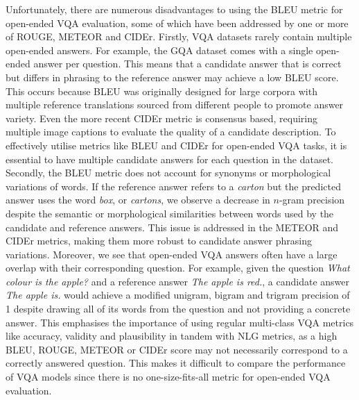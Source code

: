 Unfortunately, there are numerous disadvantages to using the BLEU metric for open-ended VQA evaluation, some of which have been addressed by one or more of ROUGE, METEOR and CIDEr.
Firstly, VQA datasets rarely contain multiple open-ended answers. For example, the GQA dataset \cite{hudson2019gqa} comes with a single open-ended answer per question. This means that a candidate answer that is correct but differs in phrasing to the reference answer may achieve a low BLEU score. This occurs because BLEU was originally designed for large corpora with multiple reference translations sourced from different people to promote answer variety. Even the more recent CIDEr metric is consensus based, requiring multiple image captions to evaluate the quality of a candidate description. To effectively utilise metrics like BLEU and CIDEr for open-ended VQA tasks, it is essential to have multiple candidate answers for each question in the dataset.
Secondly, the BLEU metric does not account for synonyms or morphological variations of words. If the reference answer refers to a \textit{carton} but the predicted answer uses the word \textit{box}, or \textit{cartons}, we observe a decrease in \(n\)-gram precision despite the semantic or morphological similarities between words used by the candidate and reference answers. This issue is addressed in the METEOR and CIDEr metrics, making them more robust to candidate answer phrasing variations.
Moreover, we see that open-ended VQA answers often have a large overlap with their corresponding question. For example, given the question \textit{What colour is the apple?} and a reference answer \textit{The apple is red.}, a candidate answer \textit{The apple is.} would achieve a modified unigram, bigram and trigram precision of 1 despite drawing all of its words from the question and not providing a concrete answer. This emphasises the importance of using regular multi-class VQA metrics like accuracy, validity and plausibility in tandem with NLG metrics, as a high BLEU, ROUGE, METEOR or CIDEr score may not necessarily correspond to a correctly answered question. This makes it difficult to compare the performance of VQA models since there is no one-size-fits-all metric for open-ended VQA evaluation.




